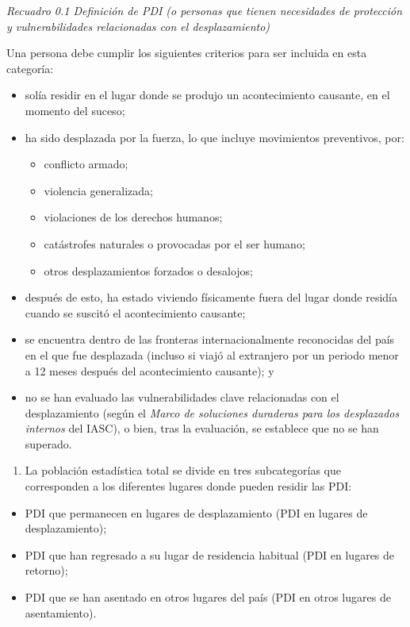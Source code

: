 \documentclass[
]{book}
\providecommand{\tightlist}{%
  \setlength{\itemsep}{0pt}\setlength{\parskip}{0pt}}
\begin{document}
\emph{Recuadro 0.1 Definición de PDI (o personas que tienen necesidades de protección y vulnerabilidades relacionadas con el desplazamiento)}

Una persona debe cumplir los siguientes criterios para ser incluida en esta categoría:

\begin{itemize}
\tightlist
\item
  solía residir en el lugar donde se produjo un acontecimiento causante, en el momento del suceso;
\item
  ha sido desplazada por la fuerza, lo que incluye movimientos preventivos, por:

  \begin{itemize}
  \tightlist
  \item
    conflicto armado;
  \item
    violencia generalizada;
  \item
    violaciones de los derechos humanos;
  \item
    catástrofes naturales o provocadas por el ser humano;
  \item
    otros desplazamientos forzados o desalojos;
  \end{itemize}
\item
  después de esto, ha estado viviendo físicamente fuera del lugar donde residía cuando se suscitó el acontecimiento causante;
\item
  se encuentra dentro de las fronteras internacionalmente reconocidas del país en el que fue desplazada (incluso si viajó al extranjero por un periodo menor a 12 meses después del acontecimiento causante); y
\item
  no se han evaluado las vulnerabilidades clave relacionadas con el desplazamiento (según el \emph{Marco de soluciones duraderas para los desplazados internos} del IASC), o bien, tras la evaluación, se establece que no se han superado.
\end{itemize}

\begin{enumerate}
\def\labelenumi{\arabic{enumi}.}
\tightlist
\item
  La población estadística total se divide en tres subcategorías que corresponden a los diferentes lugares donde pueden residir las PDI:
\end{enumerate}

\begin{itemize}
\tightlist
\item
  PDI que permanecen en lugares de desplazamiento (PDI en lugares de desplazamiento);
\item
  PDI que han regresado a su lugar de residencia habitual (PDI en lugares de retorno);
\item
  PDI que se han asentado en otros lugares del país (PDI en otros lugares de asentamiento).
\end{itemize}
\end{document}

